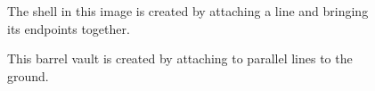 \documentclass{thesis}
\begin{document}
\begin{figure}
\caption[A triangle]{The shell in this image is created by attaching a line and bringing its endpoints together.}
\label{fig:triangle}
\end{figure}

\begin{figure}
\caption[A barrel vault]{This barrel vault is created by attaching to parallel lines to the ground.}
\label{fig:barrel_vault}
\end{figure}
\end{document}
